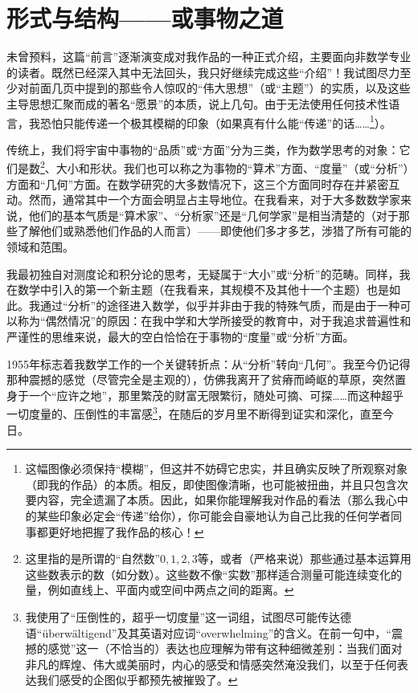 
\section{形式与结构——或事物之道}

未曾预料，这篇“前言”逐渐演变成对我作品的一种正式介绍，主要面向非数学专业的读者。既然已经深入其中无法回头，我只好继续完成这些“介绍”！我试图尽力至少对前面几页中提到的那些令人惊叹的“伟大思想”（或“主题”）的实质，以及这些主导思想汇聚而成的著名“愿景”的本质，说上几句。由于无法使用任何技术性语言，我恐怕只能传递一个极其模糊的印象（如果真有什么能“传递”的话……\footnote{这幅图像必须保持“模糊”，但这并不妨碍它忠实，并且确实反映了所观察对象（即我的作品）的本质。相反，即使图像清晰，也可能被扭曲，并且只包含次要内容，完全遗漏了本质。因此，如果你能理解我对作品的看法（那么我心中的某些印象必定会“传递”给你），你可能会自豪地认为自己比我的任何学者同事都更好地把握了我作品的核心！}）。

传统上，我们将宇宙中事物的“品质”或“方面”分为三类，作为数学思考的对象：它们是数\footnote{这里指的是所谓的“自然数”$0,1,2,3$等，或者（严格来说）那些通过基本运算用这些数表示的数（如分数）。这些数不像“实数”那样适合测量可能连续变化的量，例如直线上、平面内或空间中两点之间的距离。}、大小和形状。我们也可以称之为事物的“算术”方面、“度量”（或“分析”）方面和“几何”方面。在数学研究的大多数情况下，这三个方面同时存在并紧密互动。然而，通常其中一个方面会明显占主导地位。在我看来，对于大多数数学家来说，他们的基本气质是“算术家”、“分析家”还是“几何学家”是相当清楚的（对于那些了解他们或熟悉他们作品的人而言）——即使他们多才多艺，涉猎了所有可能的领域和范围。

我最初独自对测度论和积分论的思考，无疑属于“大小”或“分析”的范畴。同样，我在数学中引入的第一个新主题（在我看来，其规模不及其他十一个主题）也是如此。我通过“分析”的途径进入数学，似乎并非由于我的特殊气质，而是由于一种可以称为“偶然情况”的原因：在我中学和大学所接受的教育中，对于我追求普遍性和严谨性的思维来说，最大的空白恰恰在于事物的“度量”或“分析”方面。

1955年标志着我数学工作的一个关键转折点：从“分析”转向“几何”。我至今仍记得那种震撼的感觉（尽管完全是主观的），仿佛我离开了贫瘠而崎岖的草原，突然置身于一个“应许之地”，那里繁茂的财富无限繁衍，随处可摘、可探……而这种超乎一切度量的、压倒性的丰富感\footnote{我使用了“压倒性的，超乎一切度量”这一词组，试图尽可能传达德语“überwältigend”及其英语对应词“overwhelming”的含义。在前一句中，“震撼的感觉”这一（不恰当的）表达也应理解为带有这种细微差别：当我们面对非凡的辉煌、伟大或美丽时，内心的感受和情感突然淹没我们，以至于任何表达我们感受的企图似乎都预先被摧毁了。}，在随后的岁月里不断得到证实和深化，直至今日。

